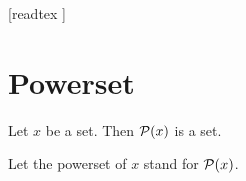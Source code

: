 \documentclass[10pt]{article}
\begin{document}
  \begin{imports}
    \begin{forthel}
      [readtex ]
    \end{forthel}
  \end{imports}


  \section{Powerset}

  \begin{forthel}
    \begin{axiom}
      Let $x$ be a set.
      Then $\mathcal{P}(x)$ is a set.
    \end{axiom}

    Let the powerset of $x$ stand for $\mathcal{P}(x)$.
  \end{forthel}
\end{document}
